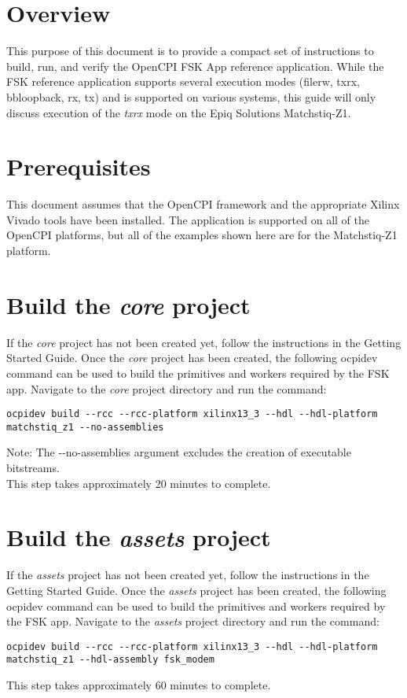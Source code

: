 \newpage
\begin{flushleft}
\section{Overview}
This purpose of this document is to provide a compact set of instructions to build, run, and verify the OpenCPI FSK App reference application. While the FSK reference application supports several execution modes (filerw, txrx, bbloopback, rx, tx) and is supported on various systems, this guide will only discuss execution of the \textit{txrx} mode on the Epiq Solutions Matchstiq-Z1.

\section{Prerequisites}
This document assumes that the OpenCPI framework and the appropriate  Xilinx Vivado tools have been installed. The application is supported on all of the OpenCPI platforms, but all of the examples shown here are for the Matchstiq-Z1 platform.

\section{Build the \textit{core} project}
If the \textit{core} project has not been created yet, follow the instructions in the Getting Started Guide. Once the \textit{core} project has been created, the following ocpidev command can be used to build the primitives and workers required by the FSK app. Navigate to the \textit{core} project directory and run the command:
\begin{verbatim}
ocpidev build --rcc --rcc-platform xilinx13_3 --hdl --hdl-platform matchstiq_z1 --no-assemblies
\end{verbatim}
Note: The -\/-no-assemblies argument excludes the creation of executable bitstreams.\\
This step takes approximately 20 minutes to complete.\\

\section{Build the \textit{assets} project}
If the \textit{assets} project has not been created yet, follow the instructions in the Getting Started Guide. Once the \textit{assets} project has been created, the following ocpidev command can be used to build the primitives and workers required by the FSK app. Navigate to the \textit{assets} project directory and run the command:
\begin{verbatim}
ocpidev build --rcc --rcc-platform xilinx13_3 --hdl --hdl-platform matchstiq_z1 --hdl-assembly fsk_modem
\end{verbatim}
This step takes approximately 60 minutes to complete.


\end{flushleft}
